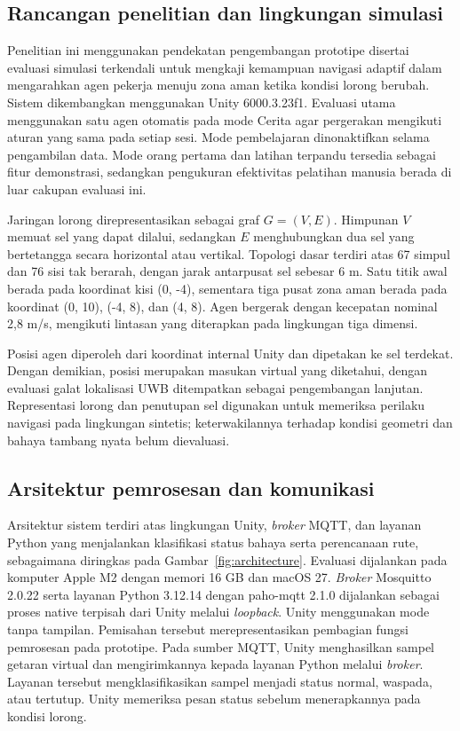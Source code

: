 \documentclass[10pt,a4paper]{article}
\begin{document}
\subsection*{Rancangan penelitian dan lingkungan simulasi}
Penelitian ini menggunakan pendekatan pengembangan prototipe disertai evaluasi simulasi terkendali untuk mengkaji kemampuan navigasi adaptif dalam mengarahkan agen pekerja menuju zona aman ketika kondisi lorong berubah. Sistem dikembangkan menggunakan Unity 6000.3.23f1. Evaluasi utama menggunakan satu agen otomatis pada mode Cerita agar pergerakan mengikuti aturan yang sama pada setiap sesi. Mode pembelajaran dinonaktifkan selama pengambilan data. Mode orang pertama dan latihan terpandu tersedia sebagai fitur demonstrasi, sedangkan pengukuran efektivitas pelatihan manusia berada di luar cakupan evaluasi ini.

Jaringan lorong direpresentasikan sebagai graf $G=(V,E)$. Himpunan $V$ memuat sel yang dapat dilalui, sedangkan $E$ menghubungkan dua sel yang bertetangga secara horizontal atau vertikal. Topologi dasar terdiri atas 67 simpul dan 76 sisi tak berarah, dengan jarak antarpusat sel sebesar 6 m. Satu titik awal berada pada koordinat kisi (0, -4), sementara tiga pusat zona aman berada pada koordinat (0, 10), (-4, 8), dan (4, 8). Agen bergerak dengan kecepatan nominal 2,8 m/s, mengikuti lintasan yang diterapkan pada lingkungan tiga dimensi.

Posisi agen diperoleh dari koordinat internal Unity dan dipetakan ke sel terdekat. Dengan demikian, posisi merupakan masukan virtual yang diketahui, dengan evaluasi galat lokalisasi UWB ditempatkan sebagai pengembangan lanjutan. Representasi lorong dan penutupan sel digunakan untuk memeriksa perilaku navigasi pada lingkungan sintetis; keterwakilannya terhadap kondisi geometri dan bahaya tambang nyata belum dievaluasi.

\subsection*{Arsitektur pemrosesan dan komunikasi}
Arsitektur sistem terdiri atas lingkungan Unity, \emph{broker} MQTT, dan layanan Python yang menjalankan klasifikasi status bahaya serta perencanaan rute, sebagaimana diringkas pada Gambar~\ref{fig:architecture}. Evaluasi dijalankan pada komputer Apple M2 dengan memori 16 GB dan macOS 27. \emph{Broker} Mosquitto 2.0.22 serta layanan Python 3.12.14 dengan paho-mqtt 2.1.0 dijalankan sebagai proses native terpisah dari Unity melalui \emph{loopback}. Unity menggunakan mode tanpa tampilan. Pemisahan tersebut merepresentasikan pembagian fungsi pemrosesan pada prototipe. Pada sumber MQTT, Unity menghasilkan sampel getaran virtual dan mengirimkannya kepada layanan Python melalui \emph{broker}. Layanan tersebut mengklasifikasikan sampel menjadi status normal, waspada, atau tertutup. Unity memeriksa pesan status sebelum menerapkannya pada kondisi lorong.
\end{document}
